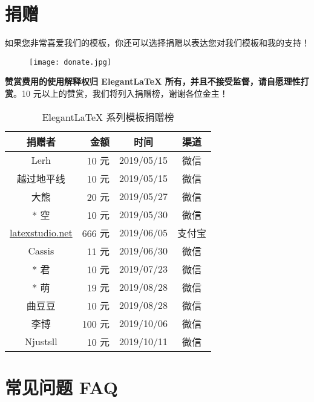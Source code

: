 \documentclass[lang=cn,11pt,authoryear,a4paper]{elegantpaper}
\begin{document}
\section{捐赠}
如果您非常喜爱我们的模板，你还可以选择捐赠以表达您对我们模板和我的支持！

\begin{figure}[htbp]
  \centering
  \texttt{[image: donate.jpg]}
\end{figure}

\textbf{赞赏费用的使用解释权归 Elegant\LaTeX{} 所有，并且不接受监督，请自愿理性打赏}。10 元以上的赞赏，我们将列入捐赠榜，谢谢各位金主！

\begin{table}[!htbp]
  \centering
  \caption{Elegant\LaTeX{} 系列模板捐赠榜}
  \begin{tabular}{crcc}
    \toprule
    捐赠者   & 金额 & 时间 & 渠道 \\
    \midrule
    Lerh  & 10 元  & 2019/05/15 & 微信 \\
    越过地平线 & 10 元    & 2019/05/15 & 微信 \\
    大熊 &  20 元 & 2019/05/27 & 微信 \\
    * 空 & 10 元 & 2019/05/30 & 微信\\
    \href{http://www.latexstudio.net/}{latexstudio.net} & 666 元 & 2019/06/05 & 支付宝\\
    Cassis & 11 元 & 2019/06/30 & 微信\\
    * 君 & 10 元 & 2019/07/23 & 微信\\
    * 萌 & 19 元 & 2019/08/28 & 微信 \\
    曲豆豆 & 10 元 & 2019/08/28 & 微信 \\
    李博 & 100 元 & 2019/10/06 & 微信\\
    Njustsll & 10 元 & 2019/10/11 & 微信 \\
  \bottomrule
  \end{tabular}%
\end{table}%

\section{常见问题 FAQ}
\end{document}
